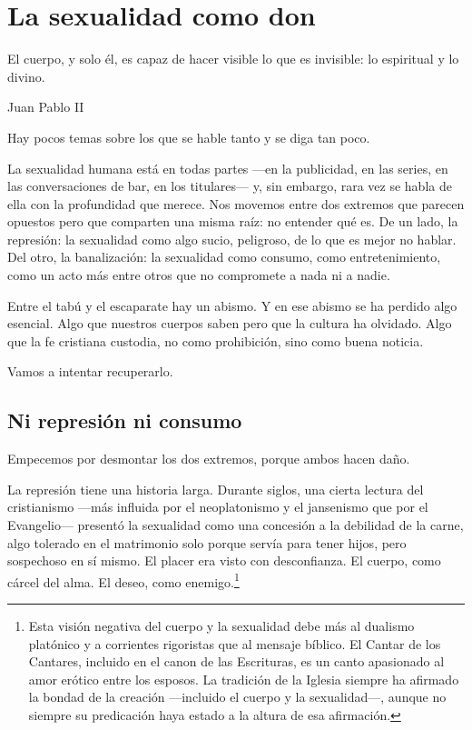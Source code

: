 \chapter{La sexualidad como don}

\epigraph{El cuerpo, y solo él, es capaz de hacer visible lo que es invisible: lo espiritual y lo divino.}{Juan Pablo II}

Hay pocos temas sobre los que se hable tanto y se diga tan poco.

La sexualidad humana está en todas partes ---en la publicidad, en las series, en las conversaciones de bar, en los titulares--- y, sin embargo, rara vez se habla de ella con la profundidad que merece. Nos movemos entre dos extremos que parecen opuestos pero que comparten una misma raíz: no entender qué es. De un lado, la represión: la sexualidad como algo sucio, peligroso, de lo que es mejor no hablar. Del otro, la banalización: la sexualidad como consumo, como entretenimiento, como un acto más entre otros que no compromete a nada ni a nadie.

Entre el tabú y el escaparate hay un abismo. Y en ese abismo se ha perdido algo esencial. Algo que nuestros cuerpos saben pero que la cultura ha olvidado. Algo que la fe cristiana custodia, no como prohibición, sino como buena noticia.

Vamos a intentar recuperarlo.

\section{Ni represión ni consumo}

Empecemos por desmontar los dos extremos, porque ambos hacen daño.

La represión tiene una historia larga. Durante siglos, una cierta lectura del cristianismo ---más influida por el neoplatonismo y el jansenismo que por el Evangelio--- presentó la sexualidad como una concesión a la debilidad de la carne, algo tolerado en el matrimonio solo porque servía para tener hijos, pero sospechoso en sí mismo. El placer era visto con desconfianza. El cuerpo, como cárcel del alma. El deseo, como enemigo.\footnote{Esta visión negativa del cuerpo y la sexualidad debe más al dualismo platónico y a corrientes rigoristas que al mensaje bíblico. El Cantar de los Cantares, incluido en el canon de las Escrituras, es un canto apasionado al amor erótico entre los esposos. La tradición de la Iglesia siempre ha afirmado la bondad de la creación ---incluido el cuerpo y la sexualidad---, aunque no siempre su predicación haya estado a la altura de esa afirmación.}


